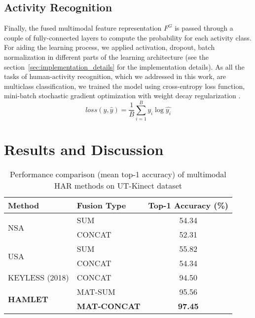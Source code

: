 \documentclass[runningheads]{llncs}
\newcommand{\pa}{HAMLET}
\begin{document}
\subsection{Activity Recognition}
Finally, the fused multimodal feature representation $F^G$ is passed through a couple of fully-connected layers to compute the probability for each activity class. For aiding the learning process, we applied activation, dropout, batch normalization in different parts of the learning architecture (see the section~\ref{sec:implementation_details} for the implementation details).
As all the tasks of human-activity recognition, which we addressed in this work, are multiclass classification, we trained the model using cross-entropy loss function, mini-batch stochastic gradient optimization with weight decay regularization \cite{adamw}.
\begin{equation}
    loss(y,\hat{y}) = \frac{1}{B} \sum_{i=1}^{B} y_i \log{\hat{y_i}}
\end{equation} \section{Results and Discussion}
\label{sec:results_and_discussion}

\begin{table}[!t]
    \centering
    \caption{Performance comparison (mean top-1 accuracy) of multimodal HAR methods on UT-Kinect dataset \cite{ut_kinect}}
    \label{tab:com_on_ut_kinect}
    \begin{tabular}{llc}
        \toprule
        \multirow{1}{*}{Method}& {Fusion Type} & Top-1 Accuracy (\%) \\
        \hline
        \multirow{2}{*}{NSA} & SUM & 54.34 \\
& CONCAT & 52.31\\
        \hline
        \multirow{2}{*}{USA} & SUM & 55.82 \\
& CONCAT & 54.34 \\
        \hline
        \multirow{1}{*}{{KEYLESS \cite{keyless} (2018)}} & CONCAT & 94.50\\
        \hline
        \multirow{2}{*}{\textbf{\pa}} & MAT-SUM & 95.56\\
& \textbf{MAT-CONCAT} & \textbf{97.45}\\
        \bottomrule
    \end{tabular}
    \vspace{-0.2in}
\end{table}
\end{document}
